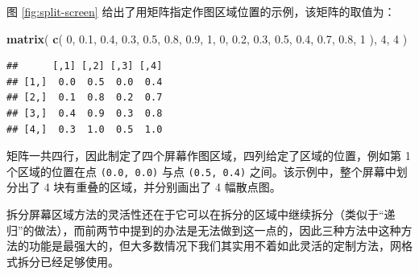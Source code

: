 \documentclass[
  b5paper,
  UTF8,twoside]{book}
\newenvironment{Shaded}{\begin{snugshade}}{\end{snugshade}}
\newcommand{\DecValTok}[1]{\textcolor[rgb]{0.00,0.00,0.81}{#1}}
\newcommand{\FloatTok}[1]{\textcolor[rgb]{0.00,0.00,0.81}{#1}}
\newcommand{\FunctionTok}[1]{\textcolor[rgb]{0.13,0.29,0.53}{\textbf{#1}}}
\newcommand{\NormalTok}[1]{#1}
\begin{document}
图 \ref{fig:split-screen} 给出了用矩阵指定作图区域位置的示例，该矩阵的取值为：

\begin{Shaded}
\begin{Highlighting}[]
\FunctionTok{matrix}\NormalTok{(}
  \FunctionTok{c}\NormalTok{(}
    \DecValTok{0}\NormalTok{, }\FloatTok{0.1}\NormalTok{, }\FloatTok{0.4}\NormalTok{, }\FloatTok{0.3}\NormalTok{,}
    \FloatTok{0.5}\NormalTok{, }\FloatTok{0.8}\NormalTok{, }\FloatTok{0.9}\NormalTok{, }\DecValTok{1}\NormalTok{,}
    \DecValTok{0}\NormalTok{, }\FloatTok{0.2}\NormalTok{, }\FloatTok{0.3}\NormalTok{, }\FloatTok{0.5}\NormalTok{,}
    \FloatTok{0.4}\NormalTok{, }\FloatTok{0.7}\NormalTok{, }\FloatTok{0.8}\NormalTok{, }\DecValTok{1}
\NormalTok{  ),}
  \DecValTok{4}\NormalTok{, }\DecValTok{4}
\NormalTok{)}
\end{Highlighting}
\end{Shaded}

\begin{verbatim}
##      [,1] [,2] [,3] [,4]
## [1,]  0.0  0.5  0.0  0.4
## [2,]  0.1  0.8  0.2  0.7
## [3,]  0.4  0.9  0.3  0.8
## [4,]  0.3  1.0  0.5  1.0
\end{verbatim}

矩阵一共四行，因此制定了四个屏幕作图区域，四列给定了区域的位置，例如第 1 个区域的位置在点 \texttt{(0.0,\ 0.0)} 与点 \texttt{(0.5,\ 0.4)} 之间。该示例中，整个屏幕中划分出了 4 块有重叠的区域，并分别画出了 4 幅散点图。

拆分屏幕区域方法的灵活性还在于它可以在拆分的区域中继续拆分（类似于``递归''的做法），而前两节中提到的办法是无法做到这一点的，因此三种方法中这种方法的功能是最强大的，但大多数情况下我们其实用不着如此灵活的定制方法，网格式拆分已经足够使用。
\end{document}
